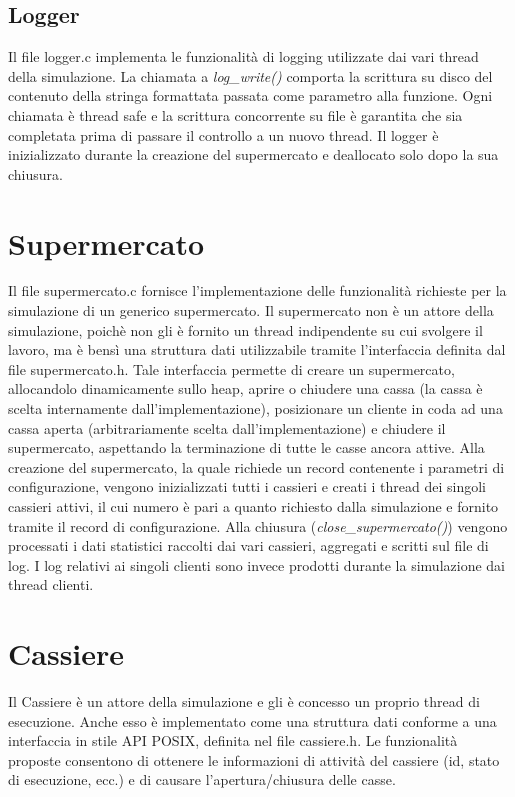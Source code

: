 \documentclass[11pt]{article}
\begin{document}
\subsection{Logger}
Il file logger.c implementa le funzionalità di logging utilizzate dai vari
thread della simulazione. La chiamata a \emph{log\_write()} comporta la
scrittura su disco del contenuto della stringa formattata passata come
parametro alla funzione. Ogni chiamata è thread safe e la scrittura concorrente
su file è garantita che sia completata prima di passare il controllo a un nuovo
thread. Il logger è inizializzato durante la creazione del supermercato e
deallocato solo dopo la sua chiusura.

\section{Supermercato}
Il file supermercato.c fornisce l'implementazione delle funzionalità richieste
per la simulazione di un generico supermercato. Il supermercato non è un attore
della simulazione, poichè non gli è fornito un thread indipendente su cui
svolgere il lavoro, ma è bensì una struttura dati utilizzabile tramite
l'interfaccia definita dal file supermercato.h. Tale interfaccia permette di
creare un supermercato, allocandolo dinamicamente sullo heap, aprire o chiudere
una cassa (la cassa è scelta internamente dall'implementazione), posizionare un
cliente in coda ad una cassa aperta (arbitrariamente scelta
dall'implementazione) e chiudere il supermercato, aspettando la terminazione di
tutte le casse ancora attive.
Alla creazione del supermercato, la quale richiede un record contenente i
parametri di configurazione, vengono inizializzati tutti i cassieri e creati i
thread dei singoli cassieri attivi, il cui numero è pari a quanto richiesto
dalla simulazione e fornito tramite il record di configurazione.
Alla chiusura (\emph{close\_supermercato()}) vengono processati i dati
statistici raccolti dai vari cassieri, aggregati e scritti sul file di log.
I log relativi ai singoli clienti sono invece prodotti durante la simulazione
dai thread clienti.

\section{Cassiere}
Il Cassiere è un attore della simulazione e gli è concesso un proprio thread di
esecuzione. Anche esso è implementato come una struttura dati conforme a una
interfaccia in stile API POSIX, definita nel file cassiere.h. Le funzionalità
proposte consentono di ottenere le informazioni di attività del cassiere (id,
stato di esecuzione, ecc.) e di causare l'apertura/chiusura delle casse.
\end{document}
